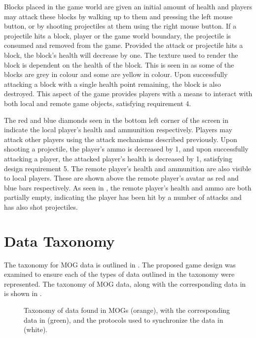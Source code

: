 Blocks placed in the game world are given an initial amount of health and players may attack these blocks by walking up to them and pressing the left mouse button, or by shooting projectiles at them using the right mouse button. If a projectile hits a block, player or the game world boundary, the projectile is consumed and removed from the game. Provided the attack or projectile hits a block, the block's health will decrease by one. The texture used to render the block is dependent on the health of the block. This is seen in  as some of the blocks are grey in colour and some are yellow in colour. Upon successfully attacking a block with a single health point remaining, the block is also destroyed. This aspect of the game provides players with a means to interact with both local and remote game objects, satisfying requirement 4.

The red and blue diamonds seen in the bottom left corner of the screen in  indicate the local player's health and ammunition respectively. Players may attack other players using the attack mechanisms described previously. Upon shooting a projectile, the player's ammo is decreased by 1, and upon successfully attacking a player, the attacked player's health is decreased by 1, satisfying design requirement 5. The remote player's health and ammunition are also visible to local players. These are shown above the remote player's avatar as red and blue bars respectively. As seen in , the remote player's health and ammo are both partially empty, indicating the player has been hit by a number of attacks and has also shot projectiles.

\section{\game{} Data Taxonomy}
The taxonomy for MOG data is outlined in . The proposed game design was examined to ensure each of the types of data outlined in the taxonomy were represented. The taxonomy of MOG data, along with the corresponding data in \game{} is shown in .

\begin{figure}[H]
    \centering
    \caption{Taxonomy of data found in MOGs (orange), with the corresponding data in \game{} (green), and the protocols used to synchronize the data in \game{} (white).}
    \label{fig:des:taxonomy-with-data}
\end{figure}

